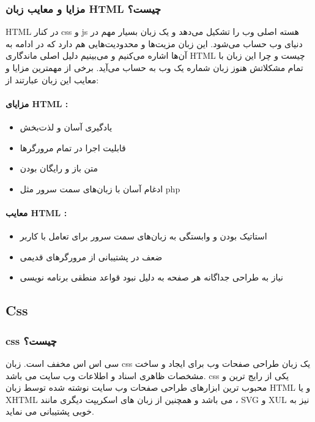 \subsubsection{مزایا و معایب زبان HTML چیست؟}
HTML در کنار css و js هسته اصلی وب را تشکیل می‌دهد و یک زبان بسیار مهم در دنیای وب حساب می‌شود. این زبان مزیت‌ها و محدودیت‌هایی هم دارد که در ادامه به آن‌ها اشاره می‌کنیم و می‌بینیم دلیل اصلی ماندگاری HTML چیست و چرا این زبان با تمام مشکلاتش هنوز زبان شماره یک وب به حساب می‌آید. برخی از مهمترین مزایا و معایب این زبان عبارتند از:

\paragraph{مزایای HTML :}
\begin{itemize}
	\item 
	یادگیری آسان و لذت‌بخش
	\item 
	قابلیت اجرا در تمام مرورگرها
	\item 
	متن باز و رایگان بودن
	\item 
	ادغام آسان با زبان‌های سمت سرور مثل php
\end{itemize}


\paragraph{معایب HTML :}
\begin{itemize}
	\item 
	استاتیک بودن و وابستگی به زبان‌های سمت سرور برای تعامل با کاربر
	\item 
	ضعف در پشتیبانی از مرورگرهای قدیمی
	\item 
	نیاز به طراحی جداگانه هر صفحه به دلیل نبود قواعد منطقی برنامه نویسی
\end{itemize}


\subsection{Css}
\subsubsection{css چیست؟}
سی اس اس مخفف 
 است. زبان css یک زبان طراحی صفحات وب برای ایجاد و ساخت مشخصات ظاهری اسناد و اطلاعات وب سایت می باشد. css یکی از رایج ترین و محبوب ترین ابزارهای طراحی صفحات وب سایت نوشته شده توسط زبان HTML و یا XHTML می باشد و همچنین از زبان های اسکریپت دیگری مانند ، SVG
  و XUL نیز به خوبی پشتیبانی می نماید.

